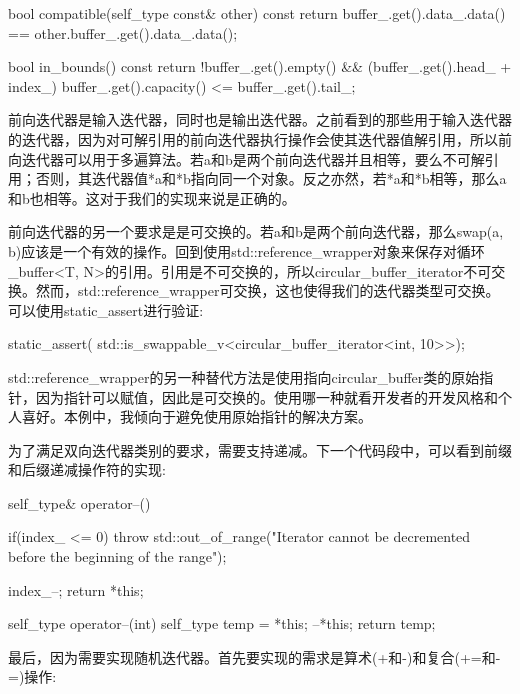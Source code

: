 \begin{cpp}
bool compatible(self_type const& other) const
{
	return buffer_.get().data_.data() ==
		   other.buffer_.get().data_.data();
}

bool in_bounds() const
{
	return
		!buffer_.get().empty() &&
		(buffer_.get().head_ + index_) %
		 buffer_.get().capacity() <= buffer_.get().tail_;
}
\end{cpp}

前向迭代器是输入迭代器，同时也是输出迭代器。之前看到的那些用于输入迭代器的迭代器，因为对可解引用的前向迭代器执行操作会使其迭代器值解引用，所以前向迭代器可以用于多遍算法。若a和b是两个前向迭代器并且相等，要么不可解引用；否则，其迭代器值*a和*b指向同一个对象。反之亦然，若*a和*b相等，那么a和b也相等。这对于我们的实现来说是正确的。

前向迭代器的另一个要求是是可交换的。若a和b是两个前向迭代器，那么swap(a, b)应该是一个有效的操作。回到使用std::reference\_wrapper对象来保存对循环\_buffer<T, N>的引用。引用是不可交换的，所以circular\_buffer\_iterator不可交换。然而，std::reference\_wrapper可交换，这也使得我们的迭代器类型可交换。可以使用static\_assert进行验证:

\begin{cpp}
static_assert(
	std::is_swappable_v<circular_buffer_iterator<int, 10>>);
\end{cpp}

\begin{important}
std::reference\_wrapper的另一种替代方法是使用指向circular\_buffer类的原始指针，因为指针可以赋值，因此是可交换的。使用哪一种就看开发者的开发风格和个人喜好。本例中，我倾向于避免使用原始指针的解决方案。
\end{important}

为了满足双向迭代器类别的要求，需要支持递减。下一个代码段中，可以看到前缀和后缀递减操作符的实现:

\begin{cpp}
self_type& operator--()
{
	if(index_ <= 0)
		throw std::out_of_range("Iterator cannot be
			decremented before the beginning of the range");
			
	index_--;
	return *this;
}

self_type operator--(int)
{
	self_type temp = *this;
	--*this;
	return temp;
}
\end{cpp}

最后，因为需要实现随机迭代器。首先要实现的需求是算术(+和-)和复合(+=和-=)操作:

